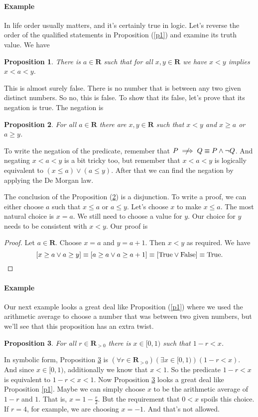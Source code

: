 \documentclass[12pt,fleqn]{article}
\newcommand{\reals}{\mathbf{R}}
\newcommand{\true}{\mathrm{True}}
\newcommand{\false}{\mathrm{False}}
\newcommand{\notimplies}{\centernot\implies}
\newenvironment{myproof}
  {\begin{shaded}\begin{proof}}
  {\end{proof}\end{shaded}}
\newtheorem{prop}{Proposition}
\newcounter{ex}\setcounter{ex}{0}
\newcommand{\ex}{%
\setcounter{ex}{\value{ex}+1}
\paragraph{Example \theex}}
\begin{document}
 \ex In life order usually matters, and it's certainly true in logic.  Let's reverse the order of the qualified statements in Proposition 
 (\ref{p1}) and examine its truth value. We have 

 \begin{prop}
  There is $a \in \reals$ such that for all $x,y \in \reals$ we have
    $x < y$ implies $x<a<y$. \label{p2}   
\end{prop}
This is almost surely false. There is no number that is between 
any two given distinct numbers. So no, this is false. To show that its false,
let's prove that its negation is true. The negation is

\begin{prop}
  For all $a \in \reals$ there are  $x,y \in \reals$ such that
    $x < y$ and  $x \geq a$ or $a \geq y$. \label{p3} 
\end{prop}
To write the negation of the predicate, remember that
$P \notimplies Q \equiv P \land \lnot Q$. And negating $x<a<y$ is 
a bit tricky too, but remember that 
$x<a<y$ is logically equivalent to $(x \leq a) \lor (a \leq y)$. After that 
we can find the negation by applying the De Morgan law.

The conclusion of the Proposition (\ref{p3}) is a disjunction.
To write a proof, we can either choose $a$ such that $x \leq a$
or $a \leq y$. Let's choose $x$ to make  $x \leq a$. The most
natural choice is $x = a$. We still need to choose a value for $y$.
Our choice for $y$ needs to be consistent with $x < y$. Our proof is

\begin{myproof} Let $a \in \reals$.  Choose $x=a$ and $y=a+1$.
  Then $x < y$ as required. We have
  \begin{equation*}
    \left[x \geq a \lor  a \geq y \right] 
    \equiv \left[a \geq a \lor  a \geq a+1 \right]
    \equiv \left[\true  \lor  \false  \right]
    \equiv \true. \qedhere
  \end{equation*}
\end{myproof}

\ex Our next example looks a great deal like Proposition  (\ref{p1}) where we used the arithmetic average to choose
a number that was between two given numbers,  but we'll see that this proposition has an extra twist.
\begin{prop} 
     For all $r \in \reals_{>0}$ there is $x \in [0,1)$ such that $1-r < x$.  \label{p4}
\end{prop}

In symbolic form, Proposition \ref{p4} is $\left(\forall r  \in \reals_{>0} \right) \left(\exists x \in [0,1)\right) \left (1-r  < x \right)$.
And since $x \in [0,1)$, additionally we know that $x < 1$.  So the predicate $1-r  < x$ is equivalent to $1-r  < x  < 1$. Now Proposition \ref{p4}
looks a great deal like  Proposition \ref{p1}. Maybe we can simply 
choose $x$ to be the arithmetic average of $1-r$ and $1$. That is,
$x = 1 - \frac{r}{2}$.  But the requirement that $0 < x$ spoils this choice. If $r = 4$, for example, we are choosing $x = -1$. And that's 
not allowed.    
\end{document}
